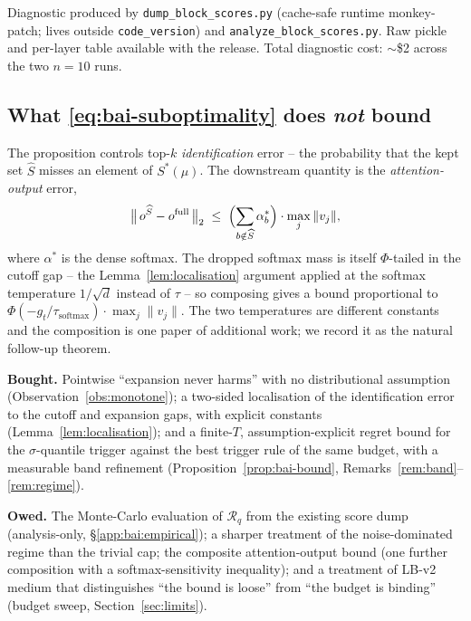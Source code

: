 \documentclass[11pt]{article}
\theoremstyle{remark}
\begin{document}
Diagnostic produced by \texttt{dump\_block\_scores.py} (cache-safe runtime monkey-patch; lives outside \texttt{code\_version}) and \texttt{analyze\_block\_scores.py}. Raw pickle and per-layer table available with the release. Total diagnostic cost: $\sim$\$2 across the two $n{=}10$ runs.

\subsection{What \eqref{eq:bai-suboptimality} does \emph{not} bound}\label{app:bai:owed}

The proposition controls top-$k$ \emph{identification} error -- the probability that the kept set $\widehat S$ misses an element of $S^*(\mu)$. The downstream quantity is the \emph{attention-output} error,
\[
\bigl\|\,o^{\widehat S} - o^{\mathrm{full}}\,\bigr\|_2 \;\le\; \Bigl(\sum_{b \notin \widehat S} \alpha^*_b\Bigr)\cdot \max_j \|v_j\|,
\]
where $\alpha^*$ is the dense softmax. The dropped softmax mass is itself $\Phi$-tailed in the cutoff gap -- the Lemma~\ref{lem:localisation} argument applied at the softmax temperature $1/\sqrt d$ instead of $\tau$ -- so composing gives a bound proportional to $\Phi(-g_t / \tau_{\mathrm{softmax}})\cdot \max_j \|v_j\|$. The two temperatures are different constants and the composition is one paper of additional work; we record it as the natural follow-up theorem.

\textbf{Bought.} Pointwise ``expansion never harms'' with no distributional assumption (Observation~\ref{obs:monotone}); a two-sided localisation of the identification error to the cutoff and expansion gaps, with explicit constants (Lemma~\ref{lem:localisation}); and a finite-$T$, assumption-explicit regret bound for the $\sigma$-quantile trigger against the best trigger rule of the same budget, with a measurable band refinement (Proposition~\ref{prop:bai-bound}, Remarks~\ref{rem:band}--\ref{rem:regime}).

\textbf{Owed.} The Monte-Carlo evaluation of $\mathcal R_q$ from the existing score dump (analysis-only, \S\ref{app:bai:empirical}); a sharper treatment of the noise-dominated regime than the trivial cap; the composite attention-output bound (one further composition with a softmax-sensitivity inequality); and a treatment of LB-v2 medium that distinguishes ``the bound is loose'' from ``the budget is binding'' (budget sweep, Section~\ref{sec:limits}).
\end{document}
